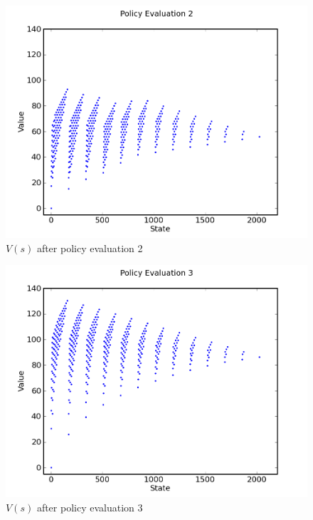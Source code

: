 \documentclass[a4paper]{article}
\begin{document}
\begin{figure}[h]
\center
\includegraphics[scale=0.8]{policy_iteration/evaluation_2.png}
\caption{$V(s)$ after policy evaluation 2}
\end{figure}

\begin{figure}[h]
\center
\includegraphics[scale=0.8]{policy_iteration/evaluation_3.png}
\caption{$V(s)$ after policy evaluation 3}
\end{figure}
\end{document}
